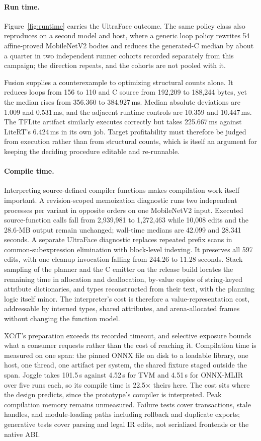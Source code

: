 \documentclass[sigplan,anonymous,review]{acmart}
\begin{document}
\paragraph{Run time.}
Figure~\ref{fig:runtime} carries the UltraFace outcome. The same policy class
also reproduces on a second model and host, where a generic loop policy rewrites
54 affine-proved MobileNetV2 bodies and reduces the generated-C median by about
a quarter in two independent runner cohorts recorded separately from this
campaign; the direction repeats, and the cohorts are not pooled with it.

Fusion supplies a counterexample to optimizing structural counts alone.
It reduces loops from 156 to 110 and C source from 192,209 to 188,244 bytes,
yet the median rises from 356.360 to 384.927\,ms. Median absolute deviations
are 1.009 and 0.531\,ms, and the adjacent runtime controls are 10.359 and
10.447\,ms. The TFLite artifact similarly executes correctly but takes
225.667\,ms against LiteRT's 6.424\,ms in its own job. Target profitability must
therefore be judged from execution rather than from structural counts, which is
itself an argument for keeping the deciding procedure editable and re-runnable.

\paragraph{Compile time.}
Interpreting source-defined compiler functions makes compilation work itself
important. A revision-scoped memoization diagnostic runs two independent
processes per variant in opposite orders on one MobileNetV2 input. Executed
source-function calls fall from 2,939,981 to 1,272,463 while 10,008 edits and
the 28.6-MB output remain unchanged; wall-time medians are 42.099 and
28.341 seconds. A separate UltraFace diagnostic replaces repeated prefix
scans in common-subexpression elimination with block-level indexing.
It preserves all 597 edits, with one cleanup invocation falling from 244.26 to
11.28 seconds. Stack sampling of the planner and the C emitter on the release build locates
the remaining time in allocation and deallocation, by-value copies of
string-keyed attribute dictionaries, and types reconstructed from their text,
with the planning logic itself minor. The interpreter's cost is therefore a
value-representation cost, addressable by interned types, shared attributes,
and arena-allocated frames without changing the function model.

XCiT's preparation exceeds its recorded timeout, and selective exposure bounds
what a consumer requests rather than the cost of reaching it. Compilation time is
measured on one span: the pinned ONNX file on disk to a loadable library, one
host, one thread, one artifact per system, the shared fixture staged outside the
span. Joggle takes 101.5\,s
against 4.52\,s for TVM and 4.51\,s for ONNX-MLIR over five runs each, so its
compile time is 22.5$\times$ theirs here. The cost sits where the design
predicts, since the prototype's compiler is interpreted. Peak compilation memory remains unmeasured. Failure tests cover
transactions, stale handles, and module-loading paths including rollback and
duplicate exports; generative tests cover parsing and legal IR edits, not
serialized frontends or the native ABI.
\end{document}
